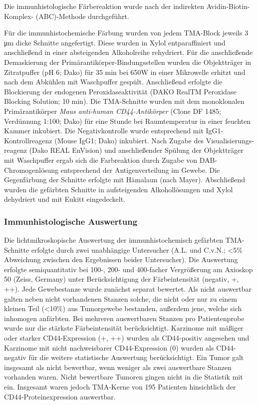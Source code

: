 Die immunhistologische Färbereaktion wurde nach der indirekten Avidin-Biotin-Komplex- (ABC)-Methode durchgeführt.

Für die immunhistochemische Färbung wurden von jedem TMA-Block jeweils 3 μm dicke Schnitte angefertigt. Diese wurden in Xylol entparaffiniert und anschließend in einer absteigenden Alkoholreihe rehydriert. Für die anschließende Demaskierung der Primärantikörper-Bindungsstellen wurden die Objektträger in Zitratpuffer (pH 6; Dako) für 35 min bei 650W in einer Mikrowelle erhitzt und nach dem Abkühlen mit Waschpuffer gespült. Anschließend erfolgte die Blockierung der endogenen Peroxidaseaktivität (DAKO RealTM Peroxidase Blocking Solution; 10 min). Die TMA-Schnitte wurden mit dem monoklonalen Primärantikörper \emph{Maus anti-human CD44-Antikörper} (Clone DF 1485; Verdünnung 1:100; Dako) für eine Stunde bei Raumtemperatur in einer feuchten Kammer inkubiert. Die Negativkontrolle wurde entsprechend mit IgG1-Kontrollreagenz (Mouse IgG1; Dako) inkubiert. Nach Zugabe des Visualisierungs-reagenz (Dako REAL EnVision) und anschließender Spülung der Objektträger mit Waschpuffer ergab sich die Farbreaktion durch Zugabe von DAB-Chromogenlösung entsprechend der Antigenverteilung im Gewebe. Die Gegenfärbung der Schnitte erfolgte mit Hämalaun (nach Mayer). Abschließend wurden die gefärbten Schnitte in aufsteigenden Alkohollösungen und Xylol dehydriert und mit Eukitt eingedeckelt.

\hypertarget{immunhistologische-auswertung}{%
\subsubsection{Immunhistologische Auswertung}\label{immunhistologische-auswertung}}

Die lichtmikroskopische Auswertung der immunhistochemisch gefärbten TMA-Schnitte erfolgte durch zwei unabhängige Untersucher (A.L. und C.v.N.; \textless5\% Abweichung zwischen den Ergebnissen beider Untersucher). Die Auswertung erfolgte semiquantitativ bei 100-, 200- und 400-facher Vergrößerung am Axioskop 50 (Zeiss, Germany) unter Berücksichtigung der Färbeintensität (negativ, +, ++). Jede Gewebestanze wurde zunächst separat bewertet. Als nicht auswertbar galten neben nicht vorhandenen Stanzen solche, die nicht oder nur zu einem kleinen Teil (\textless10\%) aus Tumorgewebe bestanden, außerdem jene, welche sich inhomogen anfärbten. Bei mehreren auswertbaren Stanzen pro Patientenprobe wurde nur die stärkste Färbeintensität berücksichtigt. Karzinome mit mäßiger oder starker CD44-Expression (+, ++) wurden als CD44-positiv angesehen und Karzinome mit nicht nachweisbarer CD44-Expression (0) wurden als CD44-negativ für die weitere statistische Auswertung berücksichtigt. Ein Tumor galt insgesamt als nicht bewertbar, wenn weniger als zwei auswertbare Stanzen vorhanden waren. Nicht bewertbare Tumoren gingen nicht in die Statistik mit ein. Insgesamt waren jedoch TMA-Kerne von 195 Patienten hinsichtlich der CD44-Proteinexpression auswertbar.

